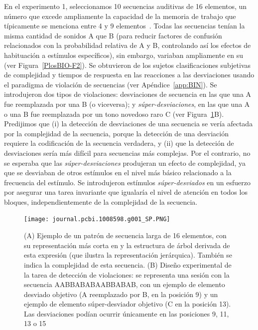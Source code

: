 En el experimento 1, seleccionamos 10 secuencias auditivas de 16 elementos, un número que excede ampliamente la capacidad de la memoria de trabajo que típicamente se menciona entre 4 y 9 elementos~\cite{f25,f29,f86}. Todas las secuencias tenían la misma cantidad de sonidos A que B (para reducir factores de confusión relacionados con la probabilidad relativa de A y B, controlando así los efectos de habituación a estímulos específicos), sin embargo, variaban ampliamente en su \mdlbin (ver Figura~\ref{PlosBIO-F2}). Se obtuvieron de los sujetos clasificaciones subjetivas de complejidad y tiempos de respuesta en las reacciones a las desviaciones usando el paradigma de violación de secuencias (ver Apéndice~\ref{app:BIN}). Se introdujeron dos tipos de violaciones: desviaciones de secuencia en las que una A fue reemplazada por una B (o viceversa); y \textit{súper-desviaciones}, en las que una A o una B fue reemplazada por un tono novedoso raro C (ver Figura~\ref{PlosBIO-F1}B). Predijimos que (i) la detección de desviaciones de una secuencia se vería afectada por la complejidad de la secuencia, porque la detección de una desviación requiere la codificación de la secuencia verdadera, y (ii) que la detección de desviaciones sería más difícil para secuencias más complejas. Por el contrario, no se esperaba que las \textit{súper-desviaciones} produjeran un efecto de complejidad, ya que se desviaban de otros estímulos en el nivel más básico relacionado a la frecuencia del estímulo. Se introdujeron estímulos \textit{súper-desviados} en un esfuerzo por asegurar una tarea invariante que igualaría el nivel de atención en todos los bloques, independientemente de la complejidad de la secuencia. 

\begin{figure}[t!]
   \texttt{[image: journal.pcbi.1008598.g001\_SP.PNG]}
   
   \centering
   
   \caption{(A) Ejemplo de un patrón de secuencia larga de 16 elementos, con su representación más corta en \grambin y la estructura de árbol derivada de esta expresión (que ilustra la representación jerárquica). También se indica la complejidad \mdlbin de esta secuencia. (B) Diseño experimental de la tarea de detección de violaciones: se representa una sesión con la secuencia AABBABABAABBABAB, con un ejemplo de elemento desviado objetivo (A reemplazado por B, en la posición 9) y un ejemplo de elemento súper-desviador objetivo (C en la posición 13). Las desviaciones podían ocurrir únicamente en las posiciones 9, 11, 13 o 15}
   \label{PlosBIO-F1}
\end{figure}

